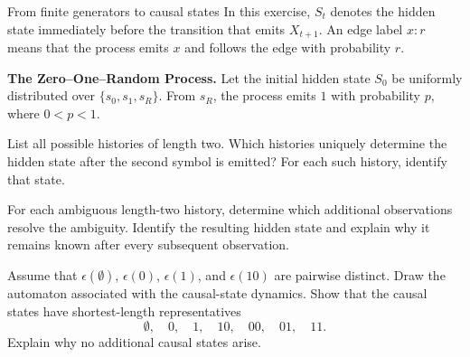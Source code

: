\begin{exercise}[Extension]{From finite generators to causal states}
  In this exercise, $S_t$ denotes the hidden state immediately before the
  transition that emits $X_{t+1}$. An edge label $x:r$ means that the
  process emits $x$ and follows the edge with probability $r$.

  \begin{parts}
    \item \textbf{The Zero--One--Random Process.}
      Let the initial hidden state $S_0$ be uniformly distributed over $\{s_0,s_1,s_R\}$.
      From $s_R$, the process emits $1$ with probability $p$, where $0<p<1$.
      \par\nobreak
      {\centering
        \par}

      \begin{subparts}
        \item List all possible histories of length two. Which histories
          uniquely determine the hidden state after the second symbol is
          emitted? For each such history, identify that state.

        \item For each ambiguous length-two history, determine which
          additional observations resolve the ambiguity. Identify the
          resulting hidden state and explain why it remains known after every
          subsequent observation.

        \item Assume that $\epsilon(\emptyset)$, $\epsilon(0)$,
          $\epsilon(1)$, and $\epsilon(10)$ are pairwise distinct. Draw the
          automaton associated with the causal-state dynamics. Show that the
          causal states have shortest-length representatives
          \[
            \emptyset,\quad 0,\quad 1,\quad 10,\quad 00,\quad 01,\quad 11.
          \]
          Explain why no additional causal states arise.


\end{subparts}
\end{parts}
\end{exercise}
